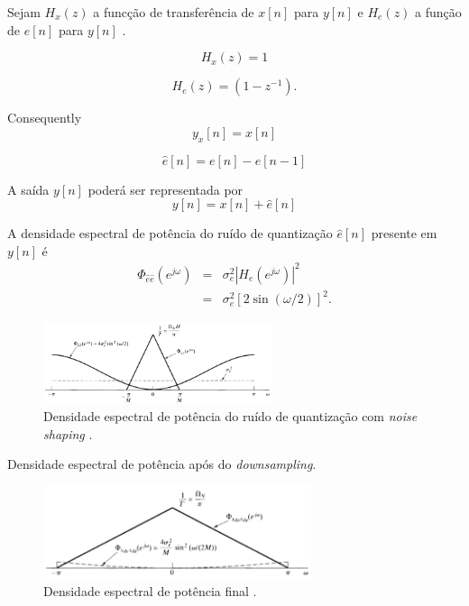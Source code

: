 \begin{frame}[allowframebreaks]
  \framebreak

  Sejam $H_x(z)$ a funcção de transferência de $x[n]$ para $y[n]$ e $H_e(z)$ a função de $e[n]$ para $y[n]$ .

  \begin{equation}
  H_x(z) = 1
  \end{equation}

  \begin{equation}
  H_e(z) = (1 - z^{-1}).
  \end{equation}

  Consequently
  \begin{equation}
  y_x [n] = x[n]
  \end{equation}
 
  \begin{equation}
  \hat{e} [n] = e[n] - e[n-1] 
  \end{equation}

  A saída $y[n]$ poderá ser representada por 
  \begin{equation}
  y [n] = x[n] + \hat{e} [n]
  \end{equation}

  \framebreak

  A densidade espectral de potência do ruído de quantização $\hat{e} [n]$ presente em $y[n]$ é
  \begin{eqnarray}
  \Phi_{\hat{e}\hat{e}} (e^{j\omega}) &=& \sigma_e^2 |H_e (e^{j\omega})|^2 \nonumber \\
                                      &=& \sigma_e^2 [2 \sin(\omega/2) ]^2 .
  \end{eqnarray}

  \begin{figure}[h!]
  \centering
  \includegraphics[width=0.6\textwidth]{images/oppenheim_fig464.png}
  \caption{Densidade espectral de potência do ruído de quantização com \textit{noise shaping} \citep{oppenheim2009}.}
  \label{fig:oppenheim_fig464}
  \end{figure}

  \framebreak

  Densidade espectral de potência após do \textit{downsampling}.
  \begin{figure}[h!]
  \centering
  \includegraphics[width=0.7\textwidth]{images/oppenheim_fig465.png}
  \caption{Densidade espectral de potência final \citep{oppenheim2009}.}
  \label{fig:oppenheim_fig465}
  \end{figure}


\end{frame}
